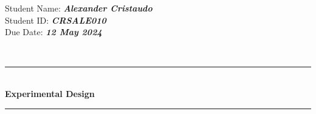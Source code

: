 \documentclass{article}
\newcommand{\HRule}[1]{\rule{\linewidth}{#1}}
\newcommand{\assignmentTitle}[4]{
    \begin{flushleft}
    \end{flushleft}
    \begin{flushright}
    Student Name: \textbf{\textit{#1}}\\ %
    Student ID: \textbf{\textit{#2}}\\ %
    Due Date: \textbf{\textit{#3}}
    \end{flushright}
    \normalsize \textsc{}
		\\ [2.0cm]
  \begin{center}
  \rule[0pt]{230pt}{1.5pt} \\
		\LARGE {\textbf{#4} } \\ %
  \rule[0pt]{230pt}{1.5pt} 
  \end{center} %
  
   

}
\begin{document}
\assignmentTitle{Alexander Cristaudo}{CRSALE010}{12 May 2024}{Experimental Design}
\end{document}
